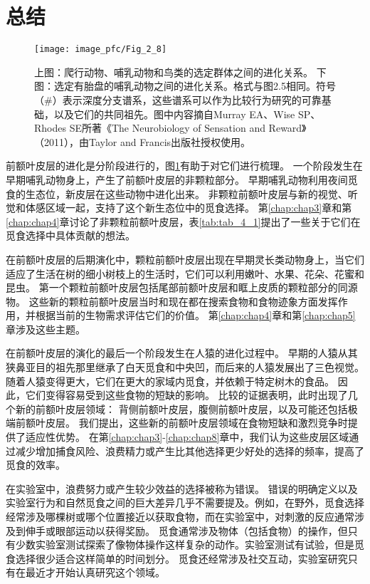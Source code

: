 \section{总结}
\begin{figure}[!htb]
	\centering
	\texttt{[image: image\_pfc/Fig\_2\_8]}
	\caption{上图：爬行动物、哺乳动物和鸟类的选定群体之间的进化关系。 下图：选定有胎盘的哺乳动物之间的进化关系。格式与图2.5相同。符号（\#）表示深度分支谱系，这些谱系可以作为比较行为研究的可靠基础，以及它们的共同祖先。图中内容摘自Murray EA、Wise SP、Rhodes SE所著《The Neurobiology of Sensation and Reward》（2011），由Taylor and Francis出版社授权使用。\label{fig:fig_2_8}}
\end{figure}


前额叶皮层的进化是分阶段进行的，图\ref{fig:fig_2_8}有助于对它们进行梳理。
一个阶段发生在早期哺乳动物身上，产生了前额叶皮层的非颗粒部分。
早期哺乳动物利用夜间觅食的生态位，新皮层在这些动物中进化出来。
非颗粒前额叶皮层与新的视觉、听觉和体感区域一起，支持了这个新生态位中的觅食选择。
第\ref{chap:chap3}章和第\ref{chap:chap4}章讨论了非颗粒前额叶皮层，表\ref{tab:tab_4_1}提出了一些关于它们在觅食选择中具体贡献的想法。


在前额叶皮层的后期演化中，颗粒前额叶皮层出现在早期灵长类动物身上，当它们适应了生活在树的细小树枝上的生活时，它们可以利用嫩叶、水果、花朵、花蜜和昆虫。
第一个颗粒前额叶皮层包括尾部前额叶皮层和眶上皮质的颗粒部分的同源物。
这些新的颗粒前额叶皮层当时和现在都在搜索食物和食物迹象方面发挥作用，并根据当前的生物需求评估它们的价值。
第\ref{chap:chap4}章和第\ref{chap:chap5}章涉及这些主题。


在前额叶皮层的演化的最后一个阶段发生在人猿的进化过程中。
早期的人猿从其狭鼻亚目的祖先那里继承了白天觅食和中央凹，而后来的人猿发展出了三色视觉。
随着人猿变得更大，它们在更大的家域内觅食，并依赖于特定树木的食品。
因此，它们变得容易受到这些食物的短缺的影响。
比较的证据表明，此时出现了几个新的前额叶皮层领域：
背侧前额叶皮层，腹侧前额叶皮层，以及可能还包括极端前额叶皮层。
我们提出，这些新的前额叶皮层领域在食物短缺和激烈竞争时提供了适应性优势。
在第\ref{chap:chap3}-\ref{chap:chap8}章中，我们认为这些皮层区域通过减少增加捕食风险、浪费精力或产生比其他选择更少好处的选择的频率，提高了觅食的效率。


在实验室中，浪费努力或产生较少效益的选择被称为错误。
错误的明确定义以及实验室行为和自然觅食之间的巨大差异几乎不需要提及。例如，在野外，觅食选择经常涉及哪棵树或哪个位置接近以获取食物，而在实验室中，对刺激的反应通常涉及到伸手或眼部运动以获得奖励。
觅食通常涉及物体（包括食物）的操作，但只有少数实验室测试探索了像物体操作这样复杂的动作。实验室测试有试验，但是觅食选择很少适合这样简单的时间划分。
觅食还经常涉及社交互动，实验室研究只有在最近才开始认真研究这个领域。


